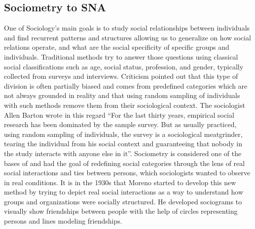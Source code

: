 \subsection{Sociometry to SNA}

One of Sociology's main goals is to study social relationships between individuals and find recurrent patterns and structures allowing us to generalize on how social relations operate, and what are the social specificity of specific groups and individuals\cite{scottSocialNetworkAnalysis1988}.
Traditional methods try to answer those questions using classical social classifications such as age, social status, profession, and gender, typically collected from surveys and interviews.
Criticism pointed out that this type of division is often partially biased and comes from predefined categories which are not always grounded in reality\cite{freemanDevelopmentSocialNetwork2004} and that using random sampling of individuals with such methods remove them from their sociological context.
The sociologist Allen Barton wrote in this regard ``For the last thirty years, empirical social research has been dominated by the sample survey. But as usually practiced, using random sampling of individuals, the survey is a sociological meatgrinder, tearing the individual from his social context and guaranteeing that nobody in the study interacts with anyone else in it''\cite{bartonSurveyResearchMacroMethodology1968}.
Sociometry is considered one of the bases of \sna and had the goal of redefining social categories through the lens of real social interactions and ties between persons, which sociologists wanted to observe in real conditions.
It is in the 1930s that Moreno started to develop this new method by trying to depict real social interactions as a way to understand how groups and organizations were socially structured\cite{morenoFoundationsSociometryIntroduction1941}.
He developed sociograms to visually show friendships between people with the help of circles representing persons and lines modeling friendships.
